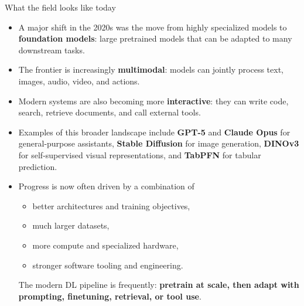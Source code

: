 \begin{vbframe}{What the field looks like today}
\vspace{.2cm}
\begin{itemize}
  \item A major shift in the 2020s was the move from highly specialized models to \textbf{foundation models}: large pretrained models that can be adapted to many downstream tasks.
\vspace{.1cm}
\item The frontier is increasingly \textbf{multimodal}: models can jointly process text, images, audio, video, and actions.
\vspace{.1cm}
\item Modern systems are also becoming more \textbf{interactive}: they can write code, search, retrieve documents, and call external tools.
\vspace{.1cm}
\item Examples of this broader landscape include \textbf{GPT-5} and \textbf{Claude Opus} for general-purpose assistants, \textbf{Stable Diffusion} for image generation, \textbf{DINOv3} for self-supervised visual representations, and \textbf{TabPFN} for tabular prediction.
\framebreak
\item Progress is now often driven by a combination of
\tiny
\begin{itemize}
\item better architectures and training objectives,
\item much larger datasets,
\item more compute and specialized hardware,
\item stronger software tooling and engineering.
\end{itemize}
\small
The modern DL pipeline is frequently: \textbf{pretrain at scale, then adapt with prompting, finetuning, retrieval, or tool use}.
\end{itemize}
\end{vbframe}

\endlecture

